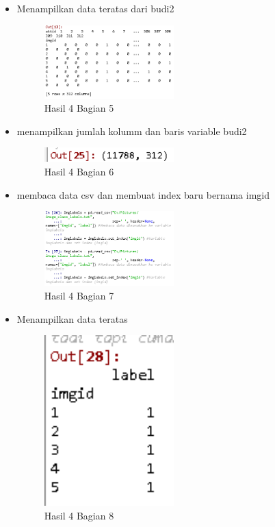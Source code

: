 \begin{itemize}
\item Menampilkan data teratas dari budi2

\begin{figure}[H]
\centerline{\includegraphics[width=5cm]{figures/1174079/3/praktek7.PNG}}
\caption{Hasil 4 Bagian 5}
\label{labelgambar}
\end{figure}

\item menampilkan jumlah kolumm dan baris variable budi2

\begin{figure}[H]
\centerline{\includegraphics[width=5cm]{figures/1174079/3/praktek8.PNG}}
\caption{Hasil 4 Bagian 6}
\label{labelgambar}
\end{figure}

\item membaca data csv dan membuat index baru bernama imgid

\begin{figure}[H]
\centerline{\includegraphics[width=5cm]{figures/1174079/3/praktek9.PNG}}
\caption{Hasil 4 Bagian 7}
\label{labelgambar}
\end{figure}

\item Menampilkan data teratas

\begin{figure}[H]
\centerline{\includegraphics[width=5cm]{figures/1174079/3/praktek10.PNG}}
\caption{Hasil 4 Bagian 8}
\label{labelgambar}
\end{figure}


\end{itemize}
